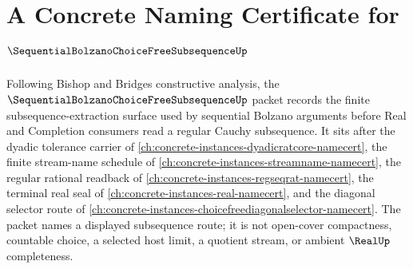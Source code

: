 \chapter{A Concrete Naming Certificate for $\SequentialBolzanoChoiceFreeSubsequenceUp$}
\label{ch:concrete-instances-sequential-bolzano-choice-free-subsequence-namecert}

Following Bishop and Bridges constructive analysis, the $\SequentialBolzanoChoiceFreeSubsequenceUp$ packet records the finite subsequence-extraction surface used by sequential Bolzano arguments before Real and Completion consumers read a regular Cauchy subsequence. It sits after the dyadic tolerance carrier of \autoref{ch:concrete-instances-dyadicratcore-namecert}, the finite stream-name schedule of \autoref{ch:concrete-instances-streamname-namecert}, the regular rational readback of \autoref{ch:concrete-instances-regseqrat-namecert}, the terminal real seal of \autoref{ch:concrete-instances-real-namecert}, and the diagonal selector route of \autoref{ch:concrete-instances-choicefreediagonalselector-namecert}. The packet names a displayed subsequence route; it is not open-cover compactness, countable choice, a selected host limit, a quotient stream, or ambient $\RealUp$ completeness.

